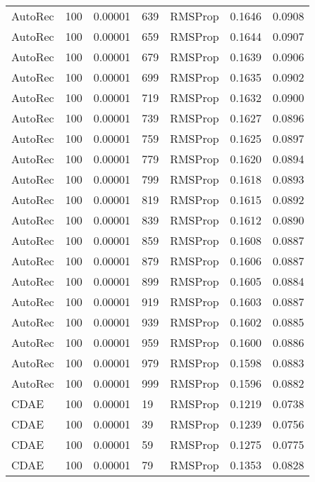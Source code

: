 \begin{tabular}{llrllrr}
 AutoRec &  100 &  0.00001 &   639 &   RMSProp &  0.1646 &       0.0908 \\
 AutoRec &  100 &  0.00001 &   659 &   RMSProp &  0.1644 &       0.0907 \\
 AutoRec &  100 &  0.00001 &   679 &   RMSProp &  0.1639 &       0.0906 \\
 AutoRec &  100 &  0.00001 &   699 &   RMSProp &  0.1635 &       0.0902 \\
 AutoRec &  100 &  0.00001 &   719 &   RMSProp &  0.1632 &       0.0900 \\
 AutoRec &  100 &  0.00001 &   739 &   RMSProp &  0.1627 &       0.0896 \\
 AutoRec &  100 &  0.00001 &   759 &   RMSProp &  0.1625 &       0.0897 \\
 AutoRec &  100 &  0.00001 &   779 &   RMSProp &  0.1620 &       0.0894 \\
 AutoRec &  100 &  0.00001 &   799 &   RMSProp &  0.1618 &       0.0893 \\
 AutoRec &  100 &  0.00001 &   819 &   RMSProp &  0.1615 &       0.0892 \\
 AutoRec &  100 &  0.00001 &   839 &   RMSProp &  0.1612 &       0.0890 \\
 AutoRec &  100 &  0.00001 &   859 &   RMSProp &  0.1608 &       0.0887 \\
 AutoRec &  100 &  0.00001 &   879 &   RMSProp &  0.1606 &       0.0887 \\
 AutoRec &  100 &  0.00001 &   899 &   RMSProp &  0.1605 &       0.0884 \\
 AutoRec &  100 &  0.00001 &   919 &   RMSProp &  0.1603 &       0.0887 \\
 AutoRec &  100 &  0.00001 &   939 &   RMSProp &  0.1602 &       0.0885 \\
 AutoRec &  100 &  0.00001 &   959 &   RMSProp &  0.1600 &       0.0886 \\
 AutoRec &  100 &  0.00001 &   979 &   RMSProp &  0.1598 &       0.0883 \\
 AutoRec &  100 &  0.00001 &   999 &   RMSProp &  0.1596 &       0.0882 \\
    CDAE &  100 &  0.00001 &    19 &   RMSProp &  0.1219 &       0.0738 \\
    CDAE &  100 &  0.00001 &    39 &   RMSProp &  0.1239 &       0.0756 \\
    CDAE &  100 &  0.00001 &    59 &   RMSProp &  0.1275 &       0.0775 \\
    CDAE &  100 &  0.00001 &    79 &   RMSProp &  0.1353 &       0.0828 \\

\end{tabular}

